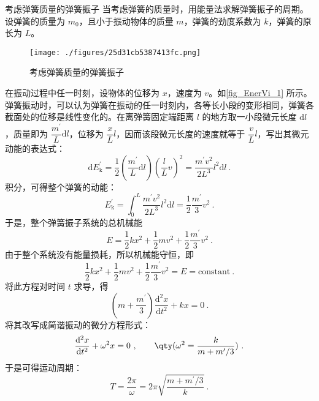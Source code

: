 \begin{example}{考虑弹簧质量的弹簧振子}
当考虑弹簧的质量时，用能量法求解弹簧振子的周期。设弹簧的质量为 $m_0$，且小于振动物体的质量 $m$，弹簧的劲度系数为 $k$，弹簧的原长为 $L$。

\begin{figure}[ht]
\centering
\texttt{[image: ./figures/25d31cb5387413fc.png]}
\caption{考虑弹簧质量的弹簧振子} \label{fig_EnerVi_1}
\end{figure}

在振动过程中任一时刻，设物体的位移为 $x $，速度为 $v$。如\autoref{fig_EnerVi_1} 所示。弹簧振动时，可以认为弹簧在振动的任一时刻内，各等长小段的变形相同，弹簧各截面处的位移是线性变化的。在离弹簧固定端距离 $l$ 的地方取一小段微元长度 $\mathrm dl$，质量即为 $\dfrac{m^\prime}{L}\mathrm{d}l$，位移为 $\dfrac{x}{L}l$，因而该段微元长度的速度就等于 $\dfrac{v}{L}l$，写出其微元动能的表达式：
\begin{equation}
\mathrm{d} E_{\mathrm{k}}^{\prime}=\frac{1}{2}\left(\frac{m^{\prime}}{L} \mathrm{d} l\right)\left(\frac{l}{L} v\right)^{2}=\frac{m^{\prime} v^{2}}{2 L^{3}} l^{2} \mathrm{d} l~.
\end{equation}
积分，可得整个弹簧的动能：
\begin{equation}
E_{\mathrm{k}}^{\prime}=\int_{0}^{L} \frac{m^{\prime} v^{2}}{2 L^{3}} l^{2} \mathrm{d} l=\frac{1}{2} \frac{m^{\prime}}{3} v^{2}~.
\end{equation}
于是，整个弹簧振子系统的总机械能
\begin{equation}
E=\frac{1}{2} k x^{2}+\frac{1}{2} m v^{2}+\frac{1}{2} \frac{m^{\prime}}{3} v^{2}~.
\end{equation}
由于整个系统没有能量损耗，所以机械能守恒，即
\begin{equation}
\frac{1}{2} k x^{2}+\frac{1}{2} m v^{2}+\frac{1}{2} \frac{m^{\prime}}{3} v^{2}=E=\mathrm{constant}~.
\end{equation}
将此方程对时间 $t $ 求导，得
\begin{equation}
\left(m+\frac{m^{\prime}}{3}\right) \frac{\mathrm{d}^{2} x}{\mathrm{d} t^{2}}+k x=0~.
\end{equation}
将其改写成简谐振动的微分方程形式：
\begin{equation}
\frac{\mathrm{d}^{2} x}{\mathrm{d} t^{2}}+\omega^{2} x=0~, \qquad \qty(\omega^{2}=\frac{k}{m+m^{\prime} / 3})~.
\end{equation}
于是可得运动周期：
\begin{equation}
T=\frac{2 \pi}{\omega}=2 \pi \sqrt{\frac{m+m^{\prime} / 3}{k}}~.
\end{equation}

\end{example}
